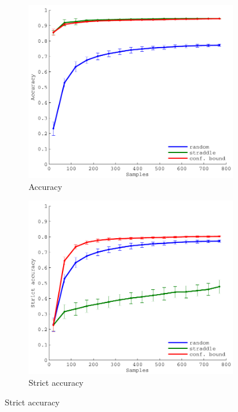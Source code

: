 \documentclass[11pt]{article} %
\begin{document}
\begin{figure}[h!]
  \begin{subfigure}[b]{0.329\textwidth}
    \centering
    \includegraphics[width=\textwidth]{figures/quake_acc}
    \caption{Accuracy}
  \end{subfigure}
  \hfill
  \begin{subfigure}[b]{0.329\textwidth}
    \centering
    \includegraphics[width=\textwidth]{figures/quake_strict_acc}
    \caption{Strict accuracy}
  \end{subfigure}

\end{figure}
\end{document}
